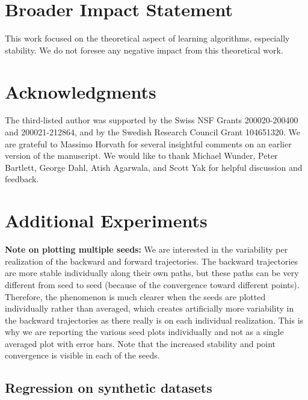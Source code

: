 \documentclass[10pt]{article} %
\theoremstyle{plain}
\theoremstyle{definition}
\theoremstyle{remark}
\begin{document}
\section*{Broader Impact Statement}

This work focused on the theoretical aspect of learning algorithms, especially stability. We do not foresee any negative impact from this theoretical work. 

\section*{Acknowledgments}
The third-listed author was supported by the Swiss NSF Grants 200020-200400 and 200021-212864, and by the Swedish Research Council Grant 104651320. We are grateful to Massimo Horvath for several insightful comments on an earlier version of the manuscript. We would like to thank Michael Wunder, Peter Bartlett, George Dahl, Atish
Agarwala, and Scott Yak for helpful discussion and feedback.






\newpage
\appendix
\onecolumn


\section{Additional Experiments}\label{appendix:experiment_details}

{\bf Note on plotting multiple seeds:} We are interested in the variability per realization of the backward and forward trajectories. The backward trajectories are more stable individually along their own paths, but these paths can be very different from seed to seed (because of the convergence toward different points). Therefore, the phenomenon is much clearer when the seeds are plotted individually rather than averaged, which creates artificially more variability in the backward trajectories as there really is on each individual realization. This is why we are reporting the various seed plots individually and not as a single averaged plot with error bars. Note that the increased stability and point convergence is visible in each of the seeds.

\newpage

\subsection{Regression on synthetic datasets}
\end{document}
